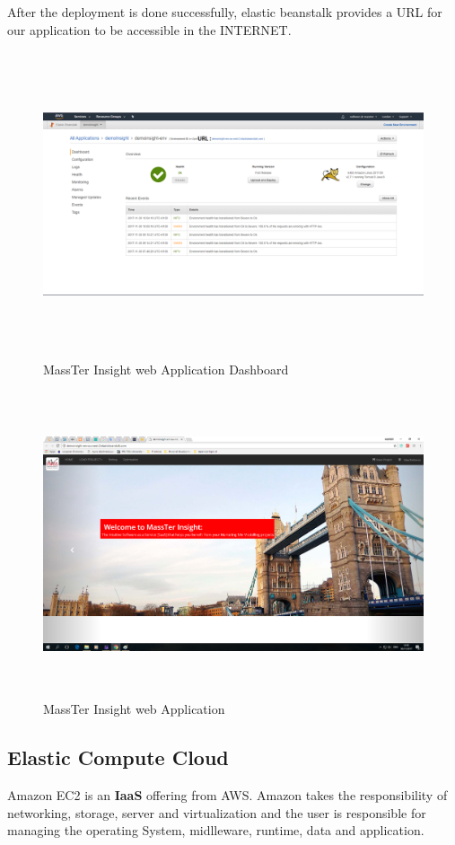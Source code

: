 After the deployment is done successfully, elastic beanstalk provides a URL for our application to be accessible in the INTERNET.
	 \begin{figure}[!h]
	\centering
	\includegraphics[width=17cm,height=9cm]{massTerInsightDashboard.png}
	\caption{MassTer Insight web Application Dashboard}	
\end{figure} 
	 \begin{figure}[!h]
	\centering
	\includegraphics[width=17cm,height=9cm]{massTerInsightWeb.png}
	\caption{MassTer Insight web Application}	
\end{figure} 
     \clearpage
	\newpage 
	\subsection{Elastic Compute Cloud}
	Amazon EC2 is an \textbf{IaaS} offering from AWS. Amazon takes the responsibility of networking, storage, server and virtualization and the user is responsible for managing the operating System, midlleware, runtime, data and application.
	

